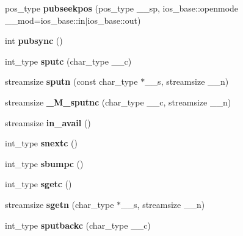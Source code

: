 \begin{DoxyCompactItemize}
pos\+\_\+type {\bfseries pubseekpos} (pos\+\_\+type \+\_\+\+\_\+sp, ios\+\_\+base\+::openmode \+\_\+\+\_\+mod=ios\+\_\+base\+::in$\vert$ios\+\_\+base\+::out)
\item 
\mbox{\label{classbasic__streambuf_a7b62dd3998cf719186b51617074fb9ba}} 
int {\bfseries pubsync} ()
\item 
\mbox{\label{classbasic__streambuf_af5cd4fded8f3bebc8129ec9c28f0e906}} 
int\+\_\+type {\bfseries sputc} (char\+\_\+type \+\_\+\+\_\+c)
\item 
\mbox{\label{classbasic__streambuf_af093182ac6b0446ad0495af558807168}} 
streamsize {\bfseries sputn} (const char\+\_\+type $\ast$\+\_\+\+\_\+s, streamsize \+\_\+\+\_\+n)
\item 
\mbox{\label{classbasic__streambuf_a0f770225cbe6d68f0bef07e652c15d53}} 
streamsize {\bfseries \+\_\+\+M\+\_\+sputnc} (char\+\_\+type \+\_\+\+\_\+c, streamsize \+\_\+\+\_\+n)
\item 
\mbox{\label{classbasic__streambuf_aca41ffbcfbd24e0ae766f2f071dd0c5c}} 
streamsize {\bfseries in\+\_\+avail} ()
\item 
\mbox{\label{classbasic__streambuf_a392c0271c1fd73246bb672ace6e1dd0a}} 
int\+\_\+type {\bfseries snextc} ()
\item 
\mbox{\label{classbasic__streambuf_abb29c7ec66827b4ce0bb5adb5a314826}} 
int\+\_\+type {\bfseries sbumpc} ()
\item 
\mbox{\label{classbasic__streambuf_ac7ce7e250f981ec9743058d6bda57c13}} 
int\+\_\+type {\bfseries sgetc} ()
\item 
\mbox{\label{classbasic__streambuf_a4b4e21551df814b980996c16292a3cf1}} 
streamsize {\bfseries sgetn} (char\+\_\+type $\ast$\+\_\+\+\_\+s, streamsize \+\_\+\+\_\+n)
\item 
\mbox{\label{classbasic__streambuf_a4c97ec8b3736798928c9263270c4b925}} 
int\+\_\+type {\bfseries sputbackc} (char\+\_\+type \+\_\+\+\_\+c)

\end{DoxyCompactItemize}
